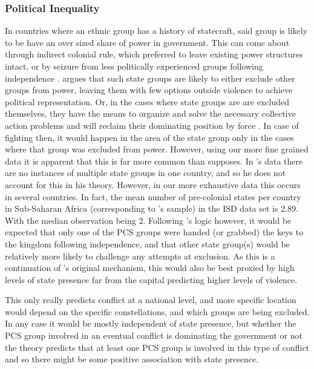 \documentclass[12pt]{article}
\begin{document}
\begin{multicols}{2}

\subsubsection{Political Inequality}

In countries where an ethnic group has a history of statecraft, said group is
likely to be have an over sized share of power in government. This can come
about through indirect colonial rule, which preferred to leave existing power
structures intact, or by seizure from less politically experienced groups
following independence \citep{Paine2019}. \citet{Paine2019} argues that such
state groups are likely to either exclude other groups from power, leaving them
with few options outside violence to achieve political representation. Or, in
the cases where state groups are are excluded themselves, they have the means to
organize and solve the necessary collective action problems and will reclaim
their dominating position by force \citep{Paine2019}. In case of fighting then,
it would happen in the area of the state group only in the cases where that
group was excluded from power. However, using our more fine grained data it is
apparent that this is far more common than \citet{Paine2019} supposes. In
\citet{Paine2019}'s data there are no instances of multiple state groups in one
country, and so he does not account for this in his theory. However, in our more
exhaustive data this occurs in several countries. In fact, the mean number of
pre-colonial states per country in Sub-Saharan Africa (corresponding to
\citet{Paine2019}'s sample) in the ISD data set is 2.89. With the median
observation being 2. Following \citet{Paine2019}'s logic however, it would be
expected that only one of the PCS groups were handed (or grabbed) the keys to
the kingdom following independence, and that other state group(s) would be
relatively more likely to challenge any attempts at exclusion.  As this is a
continuation of \citet{Paine2019}'s original mechanism, this would also be best
proxied by high levels of state presence far from the capital predicting higher
levels of violence.

This only really predicts conflict at a national level, and more specific
location would depend on the specific constellations, and which groups are being
excluded. In any case  it would be mostly independent of state presence, but
whether the PCS group involved in an eventual conflict is dominating the
government or not the theory predicts that at least one PCS group is involved in
this type of conflict and so there might be some positive association with
state presence.


\end{multicols}
\end{document}
